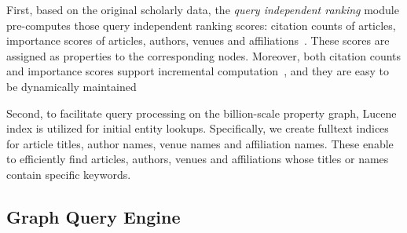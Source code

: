 First, based on the original scholarly data, the {\em query independent ranking} module pre-computes those query independent ranking scores: citation counts of articles, importance scores of articles, authors, venues and affiliations~\cite{ma2018query}. These scores are assigned as properties to the corresponding nodes.
Moreover, both citation counts and importance scores support incremental computation~\cite{ma2018query}, and they are easy to be dynamically maintained %


Second, to facilitate query processing on the billion-scale property graph, Lucene index is utilized for initial entity lookups. Specifically, we create fulltext indices for article titles, author names, venue names and affiliation names. These enable to efficiently find articles, authors, venues and affiliations whose titles or names contain specific keywords. %


\subsection{Graph Query Engine } \label{subsec:qe}


